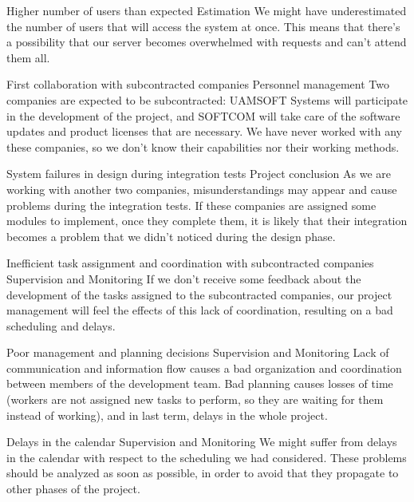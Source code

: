 \begin{risk}{Higher number of users than expected}
\riskcat Estimation
\riskdesc We might have underestimated the number of users that will access the system at once. This means that there's a possibility that our server becomes overwhelmed with requests and can't attend them all.
\end{risk}

\begin{risk}{First collaboration with subcontracted companies}
\riskcat Personnel management
\riskdesc Two companies are expected to be subcontracted: UAMSOFT Systems will participate in the development of the project, and SOFTCOM will take care of the software updates and product licenses that are necessary. We have never worked with any these companies, so we don't know their capabilities nor their working methods.
\end{risk}

\begin{risk}{System failures in design during integration tests}
\riskcat Project conclusion
\riskdesc As we are working with another two companies, misunderstandings may appear and cause problems during the integration tests. If these companies are assigned some modules to implement, once they complete them, it is likely that their integration becomes a problem that we didn't noticed during the design phase.
\end{risk}

\begin{risk}{Inefficient task assignment and coordination with subcontracted companies}
\riskcat Supervision and Monitoring
\riskdesc If we don't receive some feedback about the development of the tasks assigned to the subcontracted companies, our project management will feel the effects of this lack of coordination, resulting on a bad scheduling and delays.
\end{risk}

\begin{risk}{Poor management and planning decisions}
\riskcat Supervision and Monitoring
\riskdesc Lack of communication and information flow causes a bad organization and coordination between members of the development team. Bad planning causes losses of time (workers are not assigned new tasks to perform, so they are waiting for them instead of working), and in last term, delays in the whole project. 
\end{risk}

\begin{risk}{Delays in the calendar}
\riskcat Supervision and Monitoring
\riskdesc We might suffer from delays in the calendar with respect to the scheduling we had considered. These problems should be analyzed as soon as possible, in order to avoid that they propagate to other phases of the project.
\end{risk}

